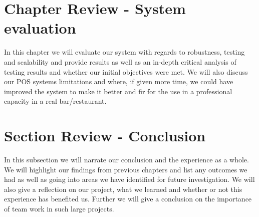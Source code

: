 \section{Chapter Review - System evaluation}

In this chapter we will evaluate our system with regards to robustness, testing and scalability and provide results as well as an in-depth critical analysis of testing results and whether our initial objectives were met.
\newline
\newline
We will also discuss our POS systems limitations and where, if given more time, we could have improved the system to make it better and fir for the use in a professional capacity in a real bar/restaurant.

\section{Section Review - Conclusion}

In this subsection we will narrate our conclusion and the experience as a whole. We will highlight our findings from previous chapters and list any outcomes we had as well as going into areas we have identified for future investigation. We will also give a reflection on our project, what we learned and whether or not this experience has benefited us. Further we will give a conclusion on the importance of team work in such large projects. 






